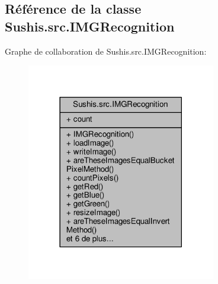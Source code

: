 \hypertarget{classSushis_1_1src_1_1IMGRecognition}{}\subsection{Référence de la classe Sushis.\+src.\+I\+M\+G\+Recognition}
\label{classSushis_1_1src_1_1IMGRecognition}


Graphe de collaboration de Sushis.\+src.\+I\+M\+G\+Recognition\+:\nopagebreak
\begin{figure}[H]
\begin{center}
\leavevmode
\includegraphics[width=234pt]{classSushis_1_1src_1_1IMGRecognition__coll__graph}
\end{center}
\end{figure}
